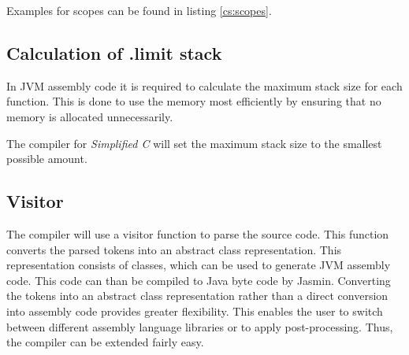 \documentclass[12pt,a4paper,titlepage,oneside,final]{article}
\begin{document}
Examples for scopes can be found in listing \vref{cs:scopes}.



\subsection{Calculation of .limit stack}
In JVM assembly code it is required to calculate the maximum stack size for each function. This is done to use the memory most efficiently by ensuring that no memory is allocated unnecessarily.

The compiler for \emph{Simplified C} will set the maximum stack size to the smallest possible amount.

\subsection{Visitor}
The compiler will use a visitor function to parse the source code. This function converts the parsed tokens into an abstract class representation. This representation consists of classes, which can be used to generate JVM assembly code. This code can than be compiled to Java byte code by Jasmin. Converting the tokens into an abstract class representation rather than a direct conversion into assembly code provides greater flexibility. This enables the user to switch between different assembly language libraries or to apply post-processing. Thus, the compiler can be extended fairly easy.
\end{document}
